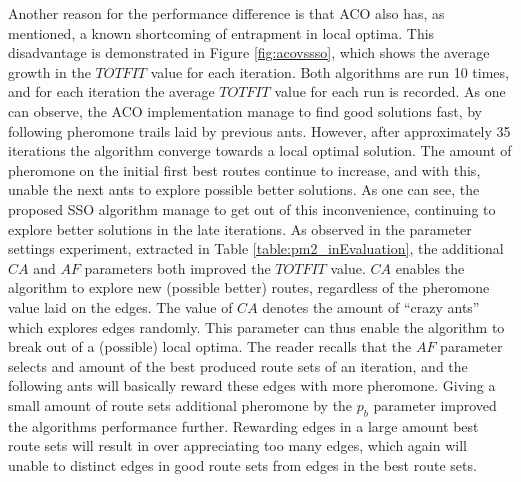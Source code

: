 Another reason for the performance difference is that ACO also has, as mentioned, a known shortcoming of entrapment in local optima. This disadvantage is demonstrated in Figure \ref{fig:acovssso}, which shows the average growth in the $TOTFIT$ value for each iteration. Both algorithms are run 10 times, and for each iteration the average $TOTFIT$ value for each run is recorded. As one can observe, the ACO implementation manage to find good solutions fast, by following pheromone trails laid by previous ants. However, after approximately 35 iterations the algorithm converge towards a local optimal solution. The amount of pheromone on the initial first best routes continue to increase, and with this, unable the next ants to explore possible better solutions. As one can see, the proposed SSO algorithm manage to get out of this inconvenience, continuing to explore better solutions in the late iterations. As observed in the parameter settings experiment, extracted in Table \vref{table:pm2_inEvaluation}, the additional $CA$ and $AF$ parameters both improved the $TOTFIT$ value. %
$CA$ enables the algorithm to explore new (possible better) routes, regardless of the pheromone value laid on the edges. The value of $CA$ denotes the amount of ``crazy ants'' which explores edges randomly. This parameter can thus enable the algorithm to break out of a (possible) local optima. The reader recalls that the $AF$ parameter selects and amount of the best produced route sets of an iteration, and the following ants will basically reward these edges with more pheromone. Giving a small amount of route sets additional pheromone by the $p_b$ parameter improved the algorithms performance further. Rewarding edges in a large amount best route sets will result in over appreciating too many edges, which again will unable to distinct edges in good route sets from edges in the best route sets.

